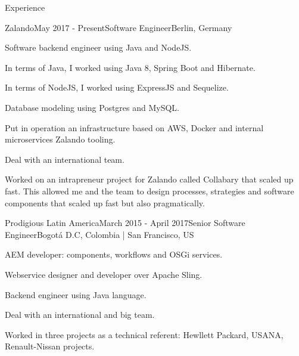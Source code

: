 \documentclass[spanish]{resume}
\begin{document}
\begin{rSection}{Experience}


\begin{rSubsection}{Zalando}{May 2017 - Present}{Software Engineer}{Berlin, Germany}
\item Software backend engineer using Java and NodeJS.
\item In terms of Java, I worked using Java 8, Spring Boot and Hibernate.
\item In terms of NodeJS, I worked using ExpressJS and Sequelize.
\item Database modeling using Postgres and MySQL.
\item Put in operation an infrastructure based on AWS, Docker and internal microservices Zalando tooling.
\item Deal with an international team.
\item Worked on an intrapreneur project for Zalando called Collabary that scaled up fast. This allowed me and the team to design processes, strategies and software components that scaled up fast but also pragmatically.
\end{rSubsection}


\begin{rSubsection}{Prodigious Latin America}{March 2015 - April 2017}{Senior Software Engineer}{Bogot\'a D.C, Colombia | San Francisco, US}
\item AEM developer: components, workflows and OSGi services.
\item Webservice designer and developer over Apache Sling.  
\item Backend engineer using Java language.
\item Deal with an international and big team.
\item Worked in three projects as a technical referent: Hewllett Packard, USANA, Renault-Nissan projects.
\end{rSubsection}



\end{rSection}
\end{document}
